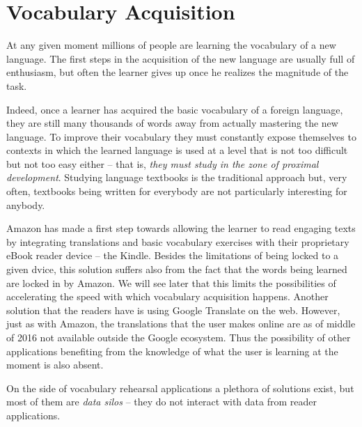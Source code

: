 
\section{Vocabulary Acquisition}


At any given moment millions of people are learning the vocabulary of a new language. The first steps in the acquisition of the new language are usually full of enthusiasm, but often the learner gives up once he realizes the magnitude of the task.

Indeed, once a learner has acquired the basic vocabulary of a foreign language, they are still many thousands of words away from actually mastering the new language. To improve their vocabulary they must constantly expose themselves to contexts in which the learned language is used at a level that is not too difficult but not too easy either -- that is, {\em they must study in the zone of proximal development}. Studying language textbooks is the traditional approach but, very often, textbooks being written for everybody are not particularly interesting for anybody.

Amazon has made a first step towards allowing the learner to read engaging texts by integrating translations and basic vocabulary exercises with their proprietary eBook reader device -- the Kindle. Besides the limitations of being locked to a given dvice, this solution suffers also from the fact that the words being learned are locked in by Amazon. We will see later that this limits the possibilities of accelerating the speed with which vocabulary acquisition happens.
Another solution that the readers have is using Google Translate on the web. However, just as with Amazon, the translations that the user makes online are as of middle of 2016 not available outside the Google ecosystem. Thus the possibility of other applications benefiting from the knowledge of what the user is learning at the moment is also absent.

On the side of vocabulary rehearsal applications a plethora of solutions exist, but most of them are {\em data silos} -- they do not interact with data from reader applications. 

